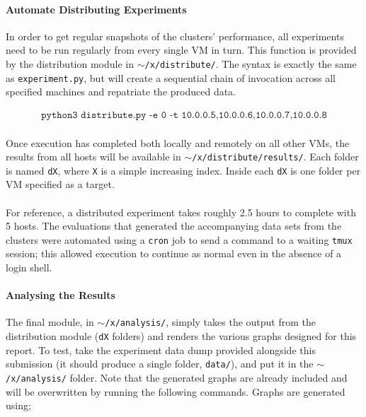 \documentclass[a4paper,10pt]{article}
\begin{document}
\paragraph{Automate Distributing Experiments} In order to get regular snapshots of the clusters' performance, all experiments need to be run regularly from every single VM in turn. This function is provided by the distribution module in \texttt{$\sim$/x/distribute/}. The syntax is exactly the same as \texttt{experiment.py}, but will create a sequential chain of invocation across all specified machines and repatriate the produced data.

\vspace{-4mm}
\begin{align*}
    \texttt{python3 distribute.py -e 0 -t 10.0.0.5,10.0.0.6,10.0.0.7,10.0.0.8}
\end{align*}

\paragraph{} Once execution has completed both locally and remotely on all other VMs, the results from all hosts will be available in \texttt{$\sim$/x/distribute/results/}. Each folder is named \texttt{dX}, where \texttt{X} is a simple increasing index. Inside each \texttt{dX} is one folder per VM specified as a target.

\paragraph{} For reference, a distributed experiment takes roughly 2.5 hours to complete with 5 hosts. The evaluations that generated the accompanying data sets from the clusters were automated using a \texttt{cron} job to send a command to a waiting \texttt{tmux} session; this allowed execution to continue as normal even in the absence of a login shell.

\paragraph{Analysing the Results} The final module, in \texttt{$\sim$/x/analysis/}, simply takes the output from the distribution module (\texttt{dX} folders) and renders the various graphs designed for this report. To test, take the experiment data dump provided alongside this submission (it should produce a single folder, \texttt{data/}), and put it in the \texttt{$\sim$/x/analysis/} folder. Note that the generated graphs are already included and will be overwritten by running the following commands. Graphs are generated using;
\end{document}
